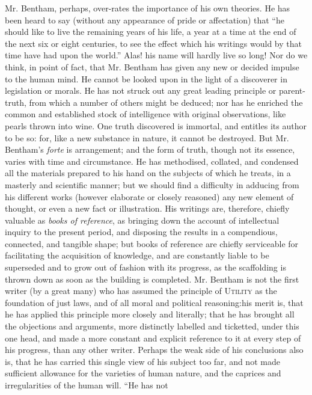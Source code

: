Mr. Bentham, perhaps, over-rates the importance of his own
theories. He has been heard to say (without any appearance of
pride or affectation) that ``he should like to live the remaining
years of his life, a year at a time at the end of the next six or
eight centuries, to see the effect which his writings would by
that time have had upon the world.'' Alas!  his name will hardly
live so long! Nor do we think, in point of fact, that Mr. Bentham
has given any new or decided impulse to the human mind.  He cannot
be looked upon in the light of a discoverer in legislation or
morals. He has not struck out any great leading principle or
parent-truth, from which a number of others might be deduced; nor
has he enriched the common and established stock of intelligence
with original observations, like pearls thrown into wine. One
truth discovered is immortal, and entitles its author to be so:
for, like a new substance in nature, it cannot be destroyed. But
Mr. Bentham's \emph{forte} is arrangement; and the form of truth,
though not its essence, varies with time and circumstance. He has
methodised, collated, and condensed all the materials prepared to
his hand on the subjects of which he treats, in a masterly and
scientific manner; but we should find a difficulty in adducing
from his different works (however elaborate or closely reasoned)
any new element of thought, or even a new fact or
illustration. His writings are, therefore, chiefly valuable as
\emph{books of reference}, as bringing down the account of
intellectual inquiry to the present period, and disposing the
results in a compendious, connected, and tangible shape; but books
of reference are chiefly serviceable for facilitating the
acquisition of knowledge, and are constantly liable to be
superseded and to grow out of fashion with its progress, as the
scaffolding is thrown down as soon as the building is
completed. Mr.  Bentham is not the first writer (by a great many)
who has assumed the principle of \textsc{Utility} as the
foundation of just laws, and of all moral and political
reasoning:\textemdash his merit is, that he has applied this
principle more closely and literally; that he has brought all the
objections and arguments, more distinctly labelled and ticketted,
under this one head, and made a more constant and explicit
reference to it at every step of his progress, than any other
writer. Perhaps the weak side of his conclusions also is, that he
has carried this single view of his subject too far, and not made
sufficient allowance for the varieties of human nature, and the
caprices and irregularities of the human will. ``He has not
